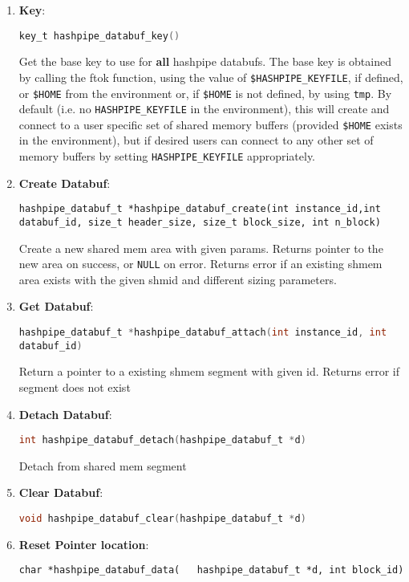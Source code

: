 \documentclass[12pt]{article}
\def\clst{\lstinline[basicstyle=\ttfamily,breaklines=true,language=C]}
\begin{document}
\begin{enumerate}
\item {\bf Key}:

\clst{key_t hashpipe_databuf_key()}

Get the base key to use for {\bf all} hashpipe databufs.  The base key is
obtained by calling the ftok function, using the value of 
{\tt \$HASHPIPE\_KEYFILE}, if defined, or {\tt \$HOME} from the environment or, 
if {\tt \$HOME} is not defined, by using {\tt \/tmp}. By default 
(i.e. no {\tt HASHPIPE\_KEYFILE} in the environment), this will create and 
connect to a user specific set of shared memory buffers (provided {\tt \$HOME} 
exists in the environment), but if desired users can connect to any other set 
of memory buffers by setting {\tt HASHPIPE\_KEYFILE} appropriately.

\item {\bf Create Databuf}:

\begin{lstlisting}
hashpipe_databuf_t *hashpipe_databuf_create(int instance_id,int databuf_id, size_t header_size, size_t block_size, int n_block)
\end{lstlisting}

Create a new shared mem area with given params.  Returns pointer to the new
area on success, or \clst{NULL} on error.  Returns error if an existing shmem area
exists with the given shmid and different sizing parameters. 

\item {\bf Get Databuf}:

\clst{hashpipe_databuf_t *hashpipe_databuf_attach(int instance_id, int databuf_id)}

Return a pointer to a existing shmem segment with given id. Returns error 
if segment does not exist 

\item {\bf Detach Databuf}:

\clst{int hashpipe_databuf_detach(hashpipe_databuf_t *d)}

Detach from shared mem segment

\item {\bf Clear Databuf}:

\clst{void hashpipe_databuf_clear(hashpipe_databuf_t *d)}

\item {\bf Reset Pointer location}:
\begin{lstlisting}
char *hashpipe_databuf_data(   hashpipe_databuf_t *d, int block_id)
\end{lstlisting}


\end{enumerate}
\end{document}
